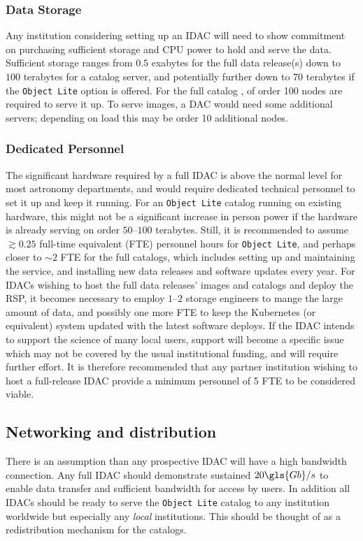 \subsubsection{Data Storage}
Any institution considering setting up an \gls{IDAC} will need to show commitment on purchasing sufficient storage and \gls{CPU} power to hold and serve the data. Sufficient storage ranges from $0.5$ exabytes for the full data release(s) down to $100$ terabytes for a catalog server, and potentially further down to $70$ terabytes if the {\tt Object Lite} option is offered. For the full catalog , of order 100 nodes are required to serve it up. To serve images, a \gls{DAC} would need some additional servers; depending on load this may be order 10 additional nodes.

\subsubsection{Dedicated Personnel}
The significant hardware required by a full  \gls{IDAC} is above the normal level for most astronomy departments, and would require dedicated technical personnel to set it up and keep it running. For an {\tt Object Lite} catalog running on existing hardware, this might not be a significant increase in person power if the hardware is already serving on order $50$--$100$ terabytes. Still, it is recommended to assume $\gtrsim0.25$ full-time equivalent (\gls{FTE}) personnel hours for {\tt Object Lite}, and perhaps closer to $\sim2$ \gls{FTE} for the full catalogs, which includes setting up and maintaining the service, and installing new data releases and software updates every year. For IDACs wishing to host the full data releases' images and catalogs and deploy the \gls{RSP}, it becomes necessary to employ $1$--$2$ storage engineers to mange the large amount of data, and possibly one more \gls{FTE} to keep the \gls{Kubernetes} (or equivalent) system updated with the latest software deploys. If the \gls{IDAC} intends to support the science of many local users, support will become a specific issue which may not be covered by the usual institutional funding, and will require further effort. It is therefore recommended that any partner institution wishing to host a full-release \gls{IDAC} provide a minimum personnel of 5 \gls{FTE} to be considered viable.

\subsection{Networking and distribution}
There is an assumption than any prospective \gls{IDAC} will have a high bandwidth connection.
Any full \gls{IDAC} should  demonstrate sustained $20 \gls{Gb}/s$ to enable data transfer and sufficient bandwidth for access by users.
In addition all IDACs should be ready  to serve the {\tt \gls{Object} Lite} catalog to any institution worldwide but especially any {\em local} institutions. This should be thought of as a redistribution mechanism for the catalogs.

